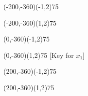 \documentclass[12pt]{article}
\begin{document}
\begin{figure}[htb]
\begin{egame}
\renewcommand{\egarrowstyle}{}

\putbranch(-200,-360)(-1,2){75}

\renewcommand{\egarrowstyle}{}

\putbranch(-200,-360)(1,2){75}





\renewcommand{\egarrowstyle}{e}

\putbranch(0,-360)(-1,2){75}

\renewcommand{\egarrowstyle}{e}

\putbranch(0,-360)(1,2){75}
[Key for $x_1$]




\renewcommand{\egarrowstyle}{e}

\putbranch(200,-360)(-1,2){75}

\renewcommand{\egarrowstyle}{e}

\putbranch(200,-360)(1,2){75}






\end{egame}
\end{figure}
\end{document}
